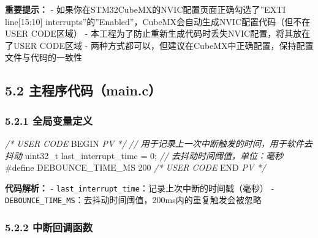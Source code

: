 \documentclass[
  chinese,
  UTF8,
  oneside,
  openany]{ctexbook}
\newenvironment{Shaded}{}{}
\newcommand{\CommentTok}[1]{\textcolor[rgb]{0.38,0.63,0.69}{\textit{#1}}}
\newcommand{\DataTypeTok}[1]{\textcolor[rgb]{0.56,0.13,0.00}{#1}}
\newcommand{\DecValTok}[1]{\textcolor[rgb]{0.25,0.63,0.44}{#1}}
\newcommand{\NormalTok}[1]{#1}
\newcommand{\OperatorTok}[1]{\textcolor[rgb]{0.40,0.40,0.40}{#1}}
\newcommand{\PreprocessorTok}[1]{\textcolor[rgb]{0.74,0.48,0.00}{#1}}
\newcommand{\RegionMarkerTok}[1]{#1}
\begin{document}
\textbf{重要提示：} - 如果你在STM32CubeMX的NVIC配置页面正确勾选了''EXTI
line{[}15:10{]}
interrupts''的''Enabled''，CubeMX会自动生成NVIC配置代码（但不在USER
CODE区域） - 本工程为了防止重新生成代码时丢失NVIC配置，将其放在了USER
CODE区域 -
两种方式都可以，但建议在CubeMX中正确配置，保持配置文件与代码的一致性

\subsection{5.2
主程序代码（main.c）}\label{ux4e3bux7a0bux5e8fux4ee3ux7801main.c}

\subsubsection{5.2.1
全局变量定义}\label{ux5168ux5c40ux53d8ux91cfux5b9aux4e49}

\begin{Shaded}
\begin{Highlighting}[]
\CommentTok{/* USER CODE }\RegionMarkerTok{BEGIN}\CommentTok{ PV */}
\CommentTok{// 用于记录上一次中断触发的时间，用于软件去抖动}
\DataTypeTok{uint32\_t}\NormalTok{ last\_interrupt\_time }\OperatorTok{=} \DecValTok{0}\OperatorTok{;}
\CommentTok{// 去抖动时间阈值，单位：毫秒}
\PreprocessorTok{\#define DEBOUNCE\_TIME\_MS }\DecValTok{200}
\CommentTok{/* USER CODE }\RegionMarkerTok{END}\CommentTok{ PV */}
\end{Highlighting}
\end{Shaded}

\textbf{代码解析：} -
\texttt{last\_interrupt\_time}：记录上次中断的时间戳（毫秒） -
\texttt{DEBOUNCE\_TIME\_MS}：去抖动时间阈值，200ms内的重复触发会被忽略

\subsubsection{5.2.2
中断回调函数}\label{ux4e2dux65adux56deux8c03ux51fdux6570}
\end{document}

